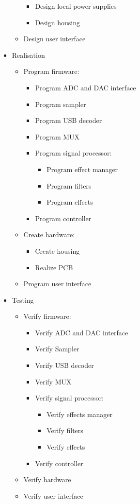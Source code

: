 \begin{itemize}
\begin{itemize}
\begin{itemize}
			\item Design local power supplies
			\item Design housing
		\end{itemize}
		\item Design user interface
	\end{itemize}
	\item Realisation
	\begin{itemize}
		\setlength\itemsep{-0.3em}
		\item Program firmware:
		\begin{itemize}
			\setlength\itemsep{-0.3em}
			\item Program ADC and DAC interface
			\item Program sampler
			\item Program USB decoder
			\item Program MUX
			\item Program signal processor:
			\begin{itemize}
				\setlength\itemsep{-0.3em}
				\item Program effect manager
				\item Program filters
				\item Program effects
			\end{itemize}
			\item Program controller 
		\end{itemize}
		\item Create hardware:
		\begin{itemize}
			\setlength\itemsep{-0.3em}
			\item Create housing
			\item Realize PCB
		\end{itemize}
		\item Program user interface 
	\end{itemize}
	\item Testing
	\begin{itemize}
		\setlength\itemsep{-0.3em}
		\item Verify firmware:
		\begin{itemize}
			\setlength\itemsep{-0.3em}
			\item Verify ADC and DAC interface	
			\item Verify Sampler
			\item Verify USB decoder
			\item Verify MUX
			\item Verify signal processor:
			\begin{itemize}
				\setlength\itemsep{-0.3em}
				\item Verify effects manager
				\item Verify filters
				\item Verify effects
			\end{itemize}
			\item Verify controller
		\end{itemize}
		\item Verify hardware
		\item Verify user interface
	\end{itemize}
\end{itemize} 


	